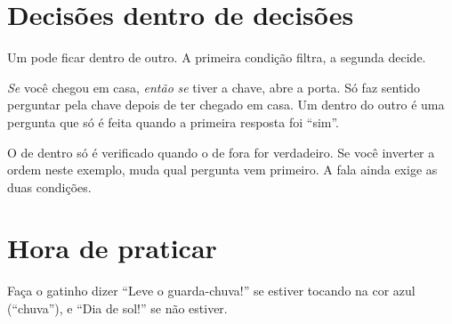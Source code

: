 \section{Decisões dentro de decisões}

Um  pode ficar dentro de outro. A primeira condição filtra, a segunda decide.

\begin{pensaassim}
\emph{Se} você chegou em casa, \emph{então} \emph{se} tiver a chave, abre a porta. Só faz sentido perguntar pela chave depois de ter chegado em casa. Um  dentro do outro é uma pergunta que só é feita quando a primeira resposta foi ``sim''.
\end{pensaassim}

\begin{codigo}
\begin{pilha}
\sbcend
\sbcend
\sbcend
\end{pilha}
\end{codigo}

\begin{cuidado}
O  de dentro só é verificado quando o de fora for verdadeiro. Se você inverter a ordem neste exemplo, muda qual pergunta vem primeiro. A fala ainda exige as duas condições.
\end{cuidado}

\section{Hora de praticar}

\begin{exercicio}
Faça o gatinho dizer ``Leve o guarda-chuva!'' se estiver tocando na cor azul (``chuva''), e ``Dia de sol!'' se não estiver.
\end{exercicio}

\begin{solucao}
\begin{pilha}
\sbcend
\sbcend
\end{pilha}
\end{solucao}

